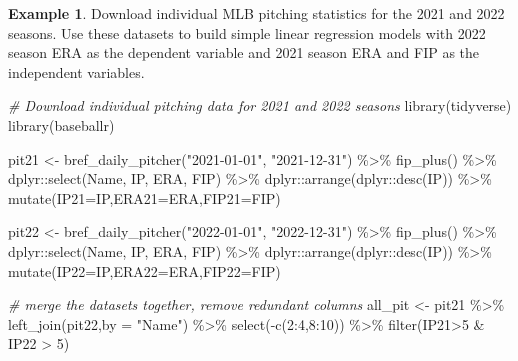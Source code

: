 \documentclass[
  11pt,
]{book}
\newenvironment{Shaded}{\begin{snugshade}}{\end{snugshade}}
\newcommand{\AttributeTok}[1]{\textcolor[rgb]{0.77,0.63,0.00}{#1}}
\newcommand{\CommentTok}[1]{\textcolor[rgb]{0.56,0.35,0.01}{\textit{#1}}}
\newcommand{\DecValTok}[1]{\textcolor[rgb]{0.00,0.00,0.81}{#1}}
\newcommand{\FunctionTok}[1]{\textcolor[rgb]{0.00,0.00,0.00}{#1}}
\newcommand{\NormalTok}[1]{#1}
\newcommand{\OtherTok}[1]{\textcolor[rgb]{0.56,0.35,0.01}{#1}}
\newcommand{\SpecialCharTok}[1]{\textcolor[rgb]{0.00,0.00,0.00}{#1}}
\newcommand{\StringTok}[1]{\textcolor[rgb]{0.31,0.60,0.02}{#1}}
\theoremstyle{definition}
\theoremstyle{definition}
\newtheorem{example}{Example}[chapter]
\theoremstyle{definition}
\theoremstyle{definition}
\theoremstyle{remark}
\begin{document}
\newpage

\begin{example}
Download individual MLB pitching statistics for the 2021 and 2022 seasons. Use these datasets to build simple linear regression models with 2022 season ERA as the dependent variable and 2021 season ERA and FIP as the independent variables.
\end{example}

\begin{Shaded}
\begin{Highlighting}[]
\CommentTok{\# Download individual pitching data for 2021 and 2022 seasons}
\FunctionTok{library}\NormalTok{(tidyverse)}
\FunctionTok{library}\NormalTok{(baseballr)}

\NormalTok{pit21 }\OtherTok{\textless{}{-}} \FunctionTok{bref\_daily\_pitcher}\NormalTok{(}\StringTok{"2021{-}01{-}01"}\NormalTok{, }\StringTok{"2021{-}12{-}31"}\NormalTok{) }\SpecialCharTok{\%\textgreater{}\%} 
  \FunctionTok{fip\_plus}\NormalTok{() }\SpecialCharTok{\%\textgreater{}\%} 
\NormalTok{  dplyr}\SpecialCharTok{::}\FunctionTok{select}\NormalTok{(Name, IP, ERA, FIP) }\SpecialCharTok{\%\textgreater{}\%}
\NormalTok{  dplyr}\SpecialCharTok{::}\FunctionTok{arrange}\NormalTok{(dplyr}\SpecialCharTok{::}\FunctionTok{desc}\NormalTok{(IP)) }\SpecialCharTok{\%\textgreater{}\%}
  \FunctionTok{mutate}\NormalTok{(}\AttributeTok{IP21=}\NormalTok{IP,}\AttributeTok{ERA21=}\NormalTok{ERA,}\AttributeTok{FIP21=}\NormalTok{FIP)}

\NormalTok{pit22 }\OtherTok{\textless{}{-}} \FunctionTok{bref\_daily\_pitcher}\NormalTok{(}\StringTok{"2022{-}01{-}01"}\NormalTok{, }\StringTok{"2022{-}12{-}31"}\NormalTok{) }\SpecialCharTok{\%\textgreater{}\%} 
  \FunctionTok{fip\_plus}\NormalTok{() }\SpecialCharTok{\%\textgreater{}\%} 
\NormalTok{  dplyr}\SpecialCharTok{::}\FunctionTok{select}\NormalTok{(Name, IP, ERA, FIP) }\SpecialCharTok{\%\textgreater{}\%}
\NormalTok{  dplyr}\SpecialCharTok{::}\FunctionTok{arrange}\NormalTok{(dplyr}\SpecialCharTok{::}\FunctionTok{desc}\NormalTok{(IP)) }\SpecialCharTok{\%\textgreater{}\%}
  \FunctionTok{mutate}\NormalTok{(}\AttributeTok{IP22=}\NormalTok{IP,}\AttributeTok{ERA22=}\NormalTok{ERA,}\AttributeTok{FIP22=}\NormalTok{FIP)}

\CommentTok{\# merge the datasets together, remove redundant columns}
\NormalTok{all\_pit }\OtherTok{\textless{}{-}}\NormalTok{ pit21 }\SpecialCharTok{\%\textgreater{}\%} 
  \FunctionTok{left\_join}\NormalTok{(pit22,}\AttributeTok{by =} \StringTok{"Name"}\NormalTok{) }\SpecialCharTok{\%\textgreater{}\%} 
  \FunctionTok{select}\NormalTok{(}\SpecialCharTok{{-}}\FunctionTok{c}\NormalTok{(}\DecValTok{2}\SpecialCharTok{:}\DecValTok{4}\NormalTok{,}\DecValTok{8}\SpecialCharTok{:}\DecValTok{10}\NormalTok{)) }\SpecialCharTok{\%\textgreater{}\%}
  \FunctionTok{filter}\NormalTok{(IP21}\SpecialCharTok{\textgreater{}}\DecValTok{5} \SpecialCharTok{\&}\NormalTok{ IP22 }\SpecialCharTok{\textgreater{}} \DecValTok{5}\NormalTok{)}


\end{Highlighting}
\end{Shaded}
\end{document}
